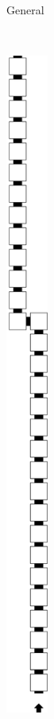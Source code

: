 \begin{itemize}
\begin{figure}[H]
\begin{subfigure}[t]{0.24\textwidth}
                \caption{\label{fig:pre_warp_general} General }
            \end{subfigure}%
            ~
            \begin{subfigure}[t]{0.24\textwidth}
                \centering
                \includegraphics[width=0.15\textwidth]{warping_pre_warp_case1_digit1_msr}

\end{subfigure}
\end{figure}
\end{itemize}
